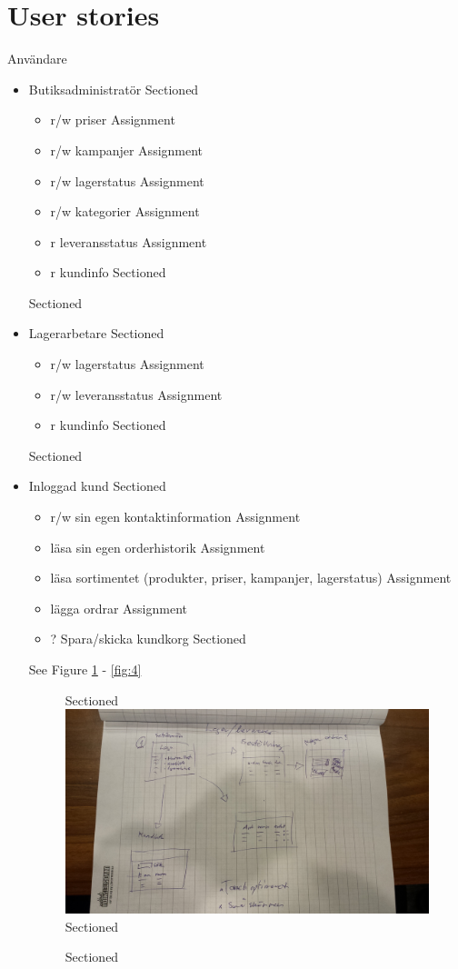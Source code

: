 \documentclass[paper=a4, fontsize=11pt]{report} %
\begin{document}
\section*{User stories}
Användare
\begin{itemize}
	Sectioned\item Butiksadministratör
		Sectioned\begin{itemize}
			Assignment\item r/w priser
			Assignment\item r/w kampanjer
			Assignment\item r/w lagerstatus
			Assignment\item r/w kategorier
			Assignment\item r leveransstatus
			Assignment\item r kundinfo
		Sectioned\end{itemize}
	Sectioned\item Lagerarbetare
		Sectioned\begin{itemize}
			Assignment\item r/w lagerstatus
			Assignment\item r/w leveransstatus
			Assignment\item r kundinfo
		Sectioned\end{itemize}
	Sectioned\item Inloggad kund
		Sectioned\begin{itemize}
			Assignment\item r/w sin egen kontaktinformation
			Assignment\item läsa sin egen orderhistorik
			Assignment\item läsa sortimentet (produkter, priser, kampanjer, lagerstatus)
			Assignment\item lägga ordrar
			Assignment\item ? Spara/skicka kundkorg
		Sectioned\end{itemize}

		See Figure \ref{fig:2} - \ref{fig:4}

	\begin{figure}
		Sectioned\includegraphics[scale=0.12]{artifacts/Lager.jpeg}
		Sectioned\caption{}
		Sectioned\label{fig:2}
	\end{figure}


\end{itemize}
\end{document}
